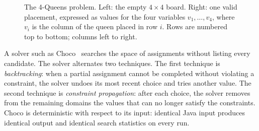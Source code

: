 \documentclass[11pt,a4paper]{article}
\begin{document}
\begin{figure}[H]
\centering
{}
\caption{The 4-Queens problem. Left: the empty $4\times 4$ board. Right: one valid placement, expressed as values for the four variables $v_1,\dots,v_4$, where $v_i$ is the column of the queen placed in row $i$. Rows are numbered top to bottom; columns left to right.}
\label{fig:4queens}
\end{figure}

A solver such as Choco~\cite{R1} searches the space of assignments without listing every candidate. The solver alternates two techniques. The first technique is \emph{backtracking}: when a partial assignment cannot be completed without violating a constraint, the solver undoes its most recent choice and tries another value. The second technique is \emph{constraint propagation}: after each choice, the solver removes from the remaining domains the values that can no longer satisfy the constraints. Choco is deterministic with respect to its input: identical Java input produces identical output and identical search statistics on every run.
\end{document}
